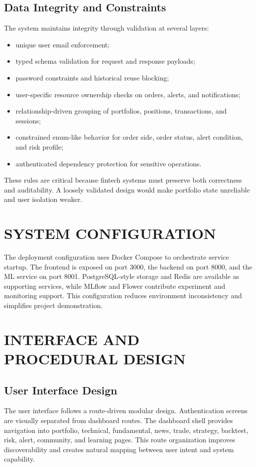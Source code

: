 \documentclass[12pt,a4paper]{report}
\begin{document}
\subsection{Data Integrity and Constraints}
The system maintains integrity through validation at several layers:
\begin{itemize}
\item unique user email enforcement;
\item typed schema validation for request and response payloads;
\item password constraints and historical reuse blocking;
\item user-specific resource ownership checks on orders, alerts, and notifications;
\item relationship-driven grouping of portfolios, positions, transactions, and sessions;
\item constrained enum-like behavior for order side, order status, alert condition, and risk profile;
\item authenticated dependency protection for sensitive operations.
\end{itemize}

These rules are critical because fintech systems must preserve both correctness and auditability. A loosely validated design would make portfolio state unreliable and user isolation weaker.

\section{SYSTEM CONFIGURATION}
The deployment configuration uses Docker Compose to orchestrate service startup. The frontend is exposed on port 3000, the backend on port 8000, and the ML service on port 8001. PostgreSQL-style storage and Redis are available as supporting services, while MLflow and Flower contribute experiment and monitoring support. This configuration reduces environment inconsistency and simplifies project demonstration.

\section{INTERFACE AND PROCEDURAL DESIGN}
\subsection{User Interface Design}
The user interface follows a route-driven modular design. Authentication screens are visually separated from dashboard routes. The dashboard shell provides navigation into portfolio, technical, fundamental, news, trade, strategy, backtest, risk, alert, community, and learning pages. This route organization improves discoverability and creates natural mapping between user intent and system capability.
\end{document}
